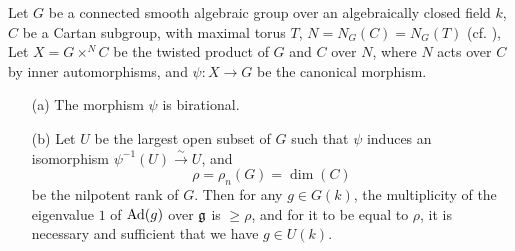 \begin{theorem}\label{scheme alg group smooth twisted product morphism for Cartan group and eigenvalue of 1}
Let $G$ be a connected smooth algebraic group over an algebraically closed field $k$, $C$ be a Cartan subgroup, with maximal torus $T$, $N=N_G(C)=N_G(T)$ (cf. \cite{scheme smooth affine ft normalizer of torus and Cartan equal}), Let $X=G\times^NC$ be the twisted product of $G$ and $C$ over $N$, where $N$ acts over $C$ by inner automorphisms, and $\psi:X\to G$ be the canonical morphism.
\begin{enumerate}
    \item[(a)] The morphism $\psi$ is birational.
    \item[(b)] Let $U$ be the largest open subset of $G$ such that $\psi$ induces an isomorphism $\psi^{-1}(U)\stackrel{\sim}{\to}U$, and
    \[\rho=\rho_n(G)=\dim(C)\]
    be the nilpotent rank of $G$. Then for any $g\in G(k)$, the multiplicity of the eigenvalue $1$ of $\mathrm{Ad}(g)$ over $\mathfrak{g}$ is $\geq\rho$, and for it to be equal to $\rho$, it is necessary and sufficient that we have $g\in U(k)$. 
\end{enumerate}
\end{theorem}
